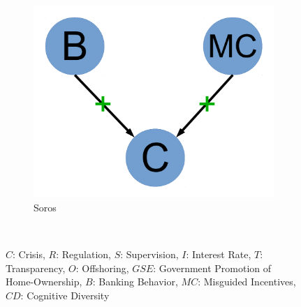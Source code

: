 \documentclass[12pt]{article}
\begin{document}
\begin{figure}
\begin{subfigure}[b]{0.2\textwidth}
                \includegraphics[width=\textwidth]{soros.pdf}
                \caption{\footnotesize Soros}
                \label{fig:soros}
        \end{subfigure}
        ~ %
       \caption{$C$: Crisis, $R$: Regulation, $S$: Supervision, $I$: Interest Rate, $T$: Transparency, $O$: Offshoring, $GSE$: Government Promotion of Home-Ownership, $B$: Banking Behavior,  $MC$: Misguided Incentives, $CD$: Cognitive Diversity}\label{fig:committe1}
\end{figure}
\end{document}
